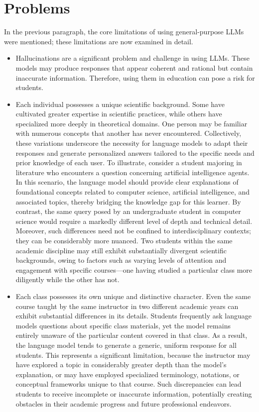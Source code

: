 \section{Problems}
In the previous paragraph, the core limitations of using general-purpose LLMs were mentioned;
these limitations are now examined in detail.
\begin{itemize}
    \item Hallucinations are a significant problem and challenge in using LLMs. These models may produce
          responses that appear coherent and rational but contain inaccurate information. Therefore, using
          them in education can pose a risk for students.
    \item Each individual possesses a unique scientific background. Some have cultivated greater
          expertise in scientific practices, while others have specialized more deeply in theoretical
          domains. One person may be familiar with numerous concepts that another has never
          encountered. Collectively, these variations underscore the necessity for language
          models to adapt their responses and generate personalized answers tailored to
          the specific needs and prior knowledge of each user.
          To illustrate, consider a student majoring in literature who encounters a question
          concerning artificial intelligence agents. In this scenario, the language model should
          provide clear explanations of foundational concepts related to computer science,
          artificial intelligence, and associated topics, thereby bridging the knowledge gap
          for this learner. By contrast, the same query posed by an undergraduate student in
          computer science would require a markedly different level of depth and technical detail.
          Moreover, such differences need not be confined to interdisciplinary contexts; they can be considerably more nuanced. Two students within the same academic discipline may still exhibit substantially divergent scientific backgrounds, owing to factors such as varying levels of attention and engagement with specific courses—one having studied a particular class more diligently while the other has not.
    \item Each class possesses its own unique and distinctive character. Even the same course
          taught by the same instructor in two different academic years can exhibit substantial
          differences in its details.
          Students frequently ask language models questions about specific class materials, yet
          the model remains entirely unaware of the particular content covered in that class.
          As a result, the language model tends to generate a generic, uniform response for all
          students. This represents a significant limitation, because the instructor may have
          explored a topic in considerably greater depth than the model’s explanation,
          or may have employed specialized terminology, notations, or conceptual frameworks
          unique to that course. Such discrepancies can lead students to receive incomplete or
          inaccurate information, potentially creating obstacles in their academic progress
          and future professional endeavors.
\end{itemize}
